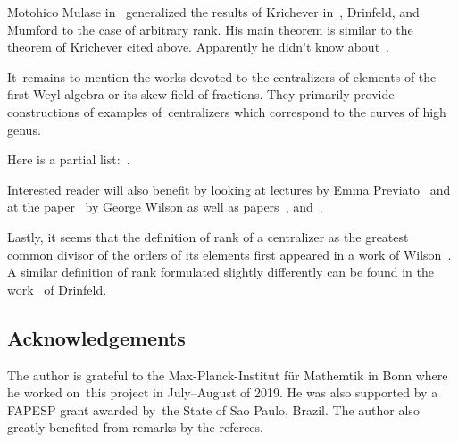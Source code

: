 \documentclass[10pt,a4paper]{amsart}
\numberwithin{equation}{section}
\begin{document}
Motohico Mulase in~\cite{Mul} generalized the results of Krichever in~\cite{K1}, Drinfeld, and Mumford to the case of arbitrary rank. His main theorem is similar to the theorem of Krichever cited above.
Apparently he didn't know about~\cite{K3}.

It~remains to mention the works devoted to the centralizers of elements of the first Weyl algebra or its skew field of fractions. They primarily provide constructions of examples of~centralizers which correspond to the curves of high genus.

Here is a partial list:~\cite{DM, De, Gri, Gru, Mi6, Mi5, Mi4, Mi3, Mi2, Mi1, MZ, Mo1, Mo3, Mo2, Mo4, O1, O2, O4, O3, P2, ZM, ZMS}.

Interested reader will also benefit by looking at lectures by Emma Previato~\cite{P1} and at the paper~\cite{W3} by George Wilson as well as papers~\cite{SW, V, W2}, and~\cite{BZ}.

Lastly, it seems that the definition of rank of a centralizer as the greatest common divisor of the orders of its elements first appeared in a work of Wilson~\cite{W1}. A similar definition of rank formulated slightly differently can be found in the work~\cite{Dr} of Drinfeld.

\subsection*{Acknowledgements}

The author is grateful to the Max-Planck-Institut f\"{u}r Mathemtik in Bonn where he worked on~this project in July--August of 2019.
He was also supported by a FAPESP grant awarded by~the State of Sao Paulo, Brazil.
The author also greatly benefited from remarks by the referees.

\end{document}
